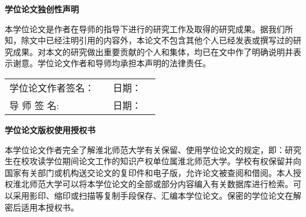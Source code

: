 

\thispagestyle{empty}
\renewcommand{\baselinestretch}{1.5}  %
\vspace*{20pt}
\begin{center}{\songti {} \textbf{学位论文独创性声明}}\end{center}
\par\vspace*{30pt}

{\fangsong{} 本学位论文是作者在导师的指导下进行的研究工作及取得的研究成果。据我们所知，除文中已经注明引用的内容外，本论文不包含其他个人已经发表或撰写过的研究成果。对本文的研究做出重要贡献的个人和集体，均已在文中作了明确说明并表示谢意。学位论文作者和导师均承担本声明的法律责任。}\\

\begin{flushright}


\fangsong{}
	\begin{tabular}{llll}
  	学位论文作者签名： & \underline{\makebox[3cm][l]{\hfill}} & 日期：& \underline{\makebox[3cm][l]{\hfill}} \\
		导 \hfill 师 \hfill 签 \hfill 名: & \underline{\makebox[3cm][l]{\hfill}} & 日期：& \underline{\makebox[3cm][l]{\hfill}} \\
	\end{tabular}
\end{flushright}

\vspace*{56pt}

\begin{center}{\songti {} \textbf{学位论文版权使用授权书}}\end{center}
\par\vspace*{30pt}

{\fangsong{} 本学位论文作者完全了解淮北师范大学有关保留、使用学位论文的规定，即：研究生在校攻读学位期间论文工作的知识产权单位属淮北师范大学。学校有权保留并向国家有关部门或机构送交论文的复印件和电子版，允许论文被查阅和借阅。本人授权淮北师范大学可以将本学位论文的全部或部分内容编入有关数据库进行检索。可以采用影印、缩印或扫描等复制手段保存、汇编本学位论文。保密的学位论文在解密后适用本授权书。}\\

